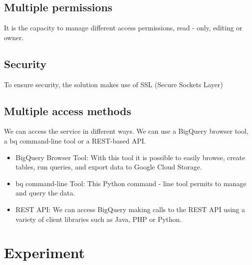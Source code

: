 \documentclass[9pt,twocolumn,twoside]{../../styles/osajnl}
\begin{document}
\subsection{Multiple permissions}
It is the capacity to manage different access permissions, read -
only, editing or owner.

\subsection{Security}
To ensure security, the solution makes use of SSL (Secure Sockets Layer)

\subsection{Multiple access methods}
We can access the service in different ways. We can use a BigQuery
browser tool, a bq command-line tool or a REST-based
API. \begin{itemize}
\item BigQuery Browser Tool: With this tool it is possible to easily browse,
create tables, run queries, and export data to Google Cloud Storage.
\item bq command-line Tool: This Python command - line tool permits
  to manage and query the data. \item REST API: We can access BigQuery
  making calls to the REST API using a variety of client libraries
  such as Java, PHP or Python.  \end{itemize}


\section{Experiment}
\end{document}

